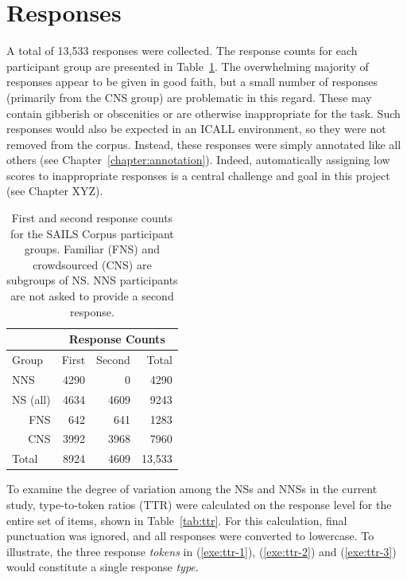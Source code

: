 \section{Responses}
\label{sec:responses}

A total of 13,533 responses were collected. The response counts for each participant group are presented in Table~\ref{tab:response-counts}. The overwhelming majority of responses appear to be given in good faith, but a small number of responses (primarily from the CNS group) are problematic in this regard. These may contain gibberish or obscenities or are otherwise inappropriate for the task. Such responses would also be expected in an ICALL environment, so they were not removed from the corpus. Instead, these responses were simply annotated like all others (see Chapter~\ref{chapter:annotation}). Indeed, automatically assigning low scores to inappropriate responses is a central challenge and goal in this project (see Chapter XYZ).

\begin{table}[htb!]
\begin{center}
\begin{tabular}{|l||r|r||r|}
\hline
& \multicolumn{3}{|c|}{Response Counts} \\
\hline
 Group & First & Second & Total \\
\hline
\hline
NNS & 4290 & 0 & 4290 \\
\hline
\hline
NS (all) & 4634 & 4609 & 9243 \\ %
\hline
\multicolumn{1}{|r||}{FNS} & 642 & 641 & 1283 \\ 
\hline
\multicolumn{1}{|r||}{CNS} & 3992 & 3968 & 7960 \\
\hline
\hline
Total & 8924 & 4609 & 13,533 \\
\hline
\end{tabular}
\caption{\label{tab:response-counts} First and second response counts for the SAILS Corpus participant groups. Familiar (FNS) and crowdsourced (CNS) are subgroups of NS. NNS participants are not asked to provide a second response.}
\end{center}
\end{table}

To examine the degree of variation among the NSs and NNSs  in the current study, type-to-token ratios (TTR) were calculated on the response level for the entire set of items, shown in Table~\ref{tab:ttr}. For this calculation, final punctuation was ignored, and all responses were converted to lowercase. To illustrate, the three response \textit{tokens} in (\ref{exe:ttr-1}), (\ref{exe:ttr-2}) and (\ref{exe:ttr-3}) would constitute a single response \textit{type}.

